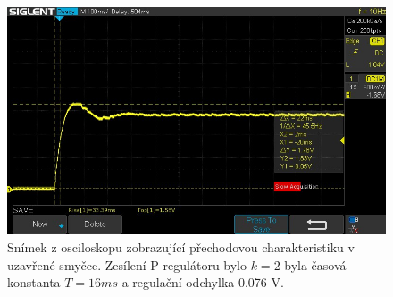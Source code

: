 		\begin{figure}[H] 
			\centering
			\includegraphics[scale=0.6]{img/SDS00001.jpg} 
			\caption{Snímek z osciloskopu zobrazující přechodovou charakteristiku v uzavřené smyčce. Zesílení P regulátoru bylo $k=2$ byla časová konstanta $T=16\unit{ms}$ a regulační odchylka 0.076 V.} 
			\label{fig:prechodova_uzavrena_k2}
		\end{figure}
		
				
			

			



